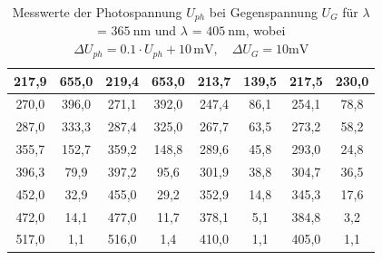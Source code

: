 \begin{table}[H]
{\begin{tabular}{|c|c|c|c|c|c|c|c|}
217,9           & 655,0             & 219,4         & 653,0            & 213,7           & 139,5          & 217,5         & 230,0            \\ \hline
270,0             & 396,0             & 271,1         & 392,0            & 247,4           & 86,1           & 254,1         & 78,8           \\ \hline
287,0             & 333,3           & 287,4         & 325,0            & 267,7           & 63,5           & 273,2         & 58,2           \\ \hline
355,7           & 152,7           & 359,2         & 148,8          & 289,6           & 45,8           & 293,0           & 24,8           \\ \hline
396,3           & 79,9            & 397,2         & 95,6           & 301,9           & 38,8           & 304,7         & 36,5           \\ \hline
452,0             & 32,9            & 455,0           & 29,2           & 352,9           & 14,8           & 345,3         & 17,6           \\ \hline
472,0             & 14,1            & 477,0          & 11,7           & 378,1           & 5,1            & 384,8         & 3,2            \\ \hline
517,0             & 1,1             & 516,0           & 1,4            & 410,0             & 1,1            & 405,0           & 1,1            \\ \hline
\end{tabular}%
}
\caption{Messwerte der Photospannung $U_{ph}$ bei Gegenspannung $U_G$ für $\lambda$ = $\SI{365}{\nm}$ und $\lambda$ = $\SI{405}{\nm}$, wobei $\Delta U_{ph} = 0.1 \cdot U_{ph} + 10\,\si{\milli\volt}, \quad
 \Delta U_{G} = 10 \si{\milli\volt}$}
\label{tab:365and405}
\end{table}

